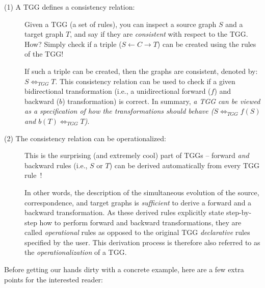 \begin{description}

\item[(1) A TGG defines a consistency relation:]%
Given a TGG (a set of rul\-es), you can inspect a source graph $S$ and a target graph $T$, and say if they are \emph{consistent} with respect to the TGG. How?
Simply check if a triple ($S\leftarrow C\rightarrow T$) can be created using the rules of the TGG!

\vspace{0.25cm}

If such a triple can be created, then the graphs are consistent, denoted by: $S \Leftrightarrow_{TGG} T$. This consistency relation can be used to check if a
given bidirectional transformation (i.e., a unidirectional forward ($f$) and
backward ($b$) transformation) is correct. In summary, \emph{a TGG can be viewed as a specification of how the transformations \emph{should} behave ($S \Leftrightarrow_{TGG} f(S)$ and $b(T) \Leftrightarrow_{TGG} T$)}.
	
\item[(2) The consistency relation can be operationalized:]%
This is the surprising (and extremely cool) part of TGGs -- forward \emph{and} backward rules (i.e., $S$ or $T$) can be derived automatically from every TGG
rule~\cite{Giese2010,Hermann2011a}! 

\vspace{0.25cm}

In other words, the description of the simultaneous evolution of the source, correspondence, and target graphs is \emph{sufficient} to derive a forward and
a backward transformation. As these derived rules explicitly state step-by-step how to perform forward and backward transformations, they are called
\emph{operational} rules as opposed to the original TGG \emph{declarative} rules specified by the user. This derivation process is therefore also referred to
as the \emph{operationalization} of a TGG.
	
\end{description}

Before getting our hands dirty with a concrete example, here are a few extra points for the interested reader:  

